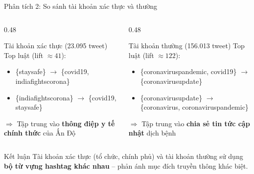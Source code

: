 \documentclass[aspectratio=169]{beamer}
\begin{document}
\begin{frame}{Phân tích 2: So sánh tài khoản xác thực và thường}
  \begin{columns}[T]
    \begin{column}{0.48\textwidth}
      \begin{block}{Tài khoản \alert{xác thực} (23.095 tweet)}
        \small
        Top luật (lift $\approx 41$):
        \begin{itemize}
          \item \{staysafe\} $\to$ \{covid19, indiafightscorona\}
          \item \{indiafightscorona\} $\to$ \{covid19, staysafe\}
        \end{itemize}
        $\Rightarrow$ Tập trung vào \textbf{thông điệp y tế chính thức} của Ấn Độ
      \end{block}
    \end{column}
    \begin{column}{0.48\textwidth}
      \begin{block}{Tài khoản \alert{thường} (156.013 tweet)}
        \small
        Top luật (lift $\approx 122$):
        \begin{itemize}
          \item \{coronaviruspandemic, covid19\} $\to$ \{coronavirusupdate\}
          \item \{coronavirusupdate\} $\to$ \{coronavirus, coronaviruspandemic\}
        \end{itemize}
        $\Rightarrow$ Tập trung vào \textbf{chia sẻ tin tức cập nhật} dịch bệnh
      \end{block}
    \end{column}
  \end{columns}

  \vspace{0.5em}
  \begin{exampleblock}{Kết luận}
    Tài khoản xác thực (tổ chức, chính phủ) và tài khoản thường sử dụng \textbf{bộ từ vựng hashtag khác nhau} -- phản ánh mục đích truyền thông khác biệt.
  \end{exampleblock}
\end{frame}
\end{document}
